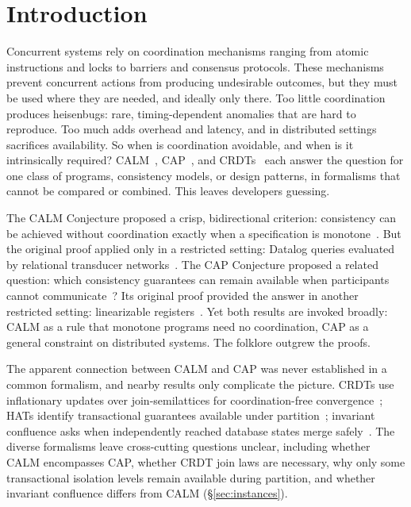 \documentclass[sigconf]{cidr-2027}
\theoremstyle{remark}
\begin{document}

\maketitle

\section{Introduction}
\label{sec:intro}

Concurrent systems rely on coordination mechanisms ranging from
atomic instructions and locks to barriers and consensus protocols.  These mechanisms
prevent concurrent actions from producing undesirable outcomes, but they must be
used where they are needed, and ideally only there.  Too little coordination
produces heisenbugs: rare, timing-dependent anomalies that are hard to
reproduce.  Too much adds overhead and latency, and in distributed settings
sacrifices availability.  So when is coordination avoidable, and when is it
intrinsically required?  CALM~\cite{ameloot2013relational},
CAP~\cite{gilbert2002cap}, and CRDTs~\cite{shapiro2011crdt} each answer the
question for one class of programs, consistency models, or design patterns, in
formalisms that cannot be compared or combined.  This leaves developers
guessing.

The CALM Conjecture proposed a crisp, bidirectional criterion: consistency can
be achieved without coordination exactly when a specification is
monotone~\cite{hellerstein2010declarative}.  But the original proof applied only
in a restricted setting: Datalog queries evaluated by relational transducer
networks~\cite{ameloot2013relational,hellerstein2020keeping}.  The CAP
Conjecture proposed a related question: which consistency guarantees can remain
available when participants cannot
communicate~\cite{brewer2000towards,brewer2012cap}?  Its original proof
provided the answer in another restricted setting: linearizable registers~\cite{gilbert2002cap}.
Yet both results are invoked broadly: CALM as a
rule that monotone programs need no coordination, CAP as a general constraint
on distributed systems. The folklore outgrew the proofs.

The apparent connection between CALM and CAP was never established in a common
formalism, and nearby results only complicate the picture. CRDTs use
inflationary updates over join-semilattices for coordination-free
convergence~\cite{shapiro2011crdt}; HATs identify transactional guarantees
available under partition~\cite{bailis2013hat}; invariant confluence asks when
independently reached database states merge
safely~\cite{bailis2014coordination}. The diverse formalisms leave cross-cutting
questions unclear, including whether CALM encompasses CAP, whether CRDT join
laws are necessary, why only some transactional isolation levels remain
available during partition, and whether invariant confluence differs from CALM
(\S\ref{sec:instances}).
\end{document}
